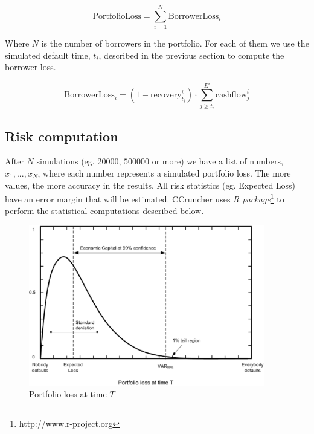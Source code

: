 \documentclass[a4paper,12pt,final]{article}
\begin{document}
\begin{displaymath}
\mathrm{PortfolioLoss} = \sum_{i=1}^N \mathrm{BorrowerLoss}_i
\end{displaymath}

Where $N$ is the number of borrowers in the portfolio. For each of them we 
use the simulated default time, $t_i$, described in the previous section to 
compute the borrower loss.

\begin{displaymath}
\mathrm{BorrowerLoss}_{i} = (1 - \mathrm{recovery}_{t_i}^i) \cdot \sum_{j \ge {t_i}}^{E^i} \mathrm{cashflow}_{j}^i
\end{displaymath}

\subsection{Risk computation}
After $N$ simulations (eg. $20000$, $500000$ or more) we have a list
of numbers, ${x_1, ..., x_N}$, where each number represents a simulated portfolio 
loss. The more values, the more accuracy in the results. All risk statistics (eg. 
Expected Loss) have an error margin that will be estimated. CCruncher uses 
\emph{R package}\footnote{http://www.r-project.org} to perform the statistical
computations described below.
\newline

\begin{figure}[!hbt]
\begin{center}
\includegraphics[height=7cm, angle=0]{./images/creditvar.eps}
\caption{Portfolio loss at time $T$}
\label{creditvar}
\end{center}
\end{figure}
\FloatBarrier

\end{document}
